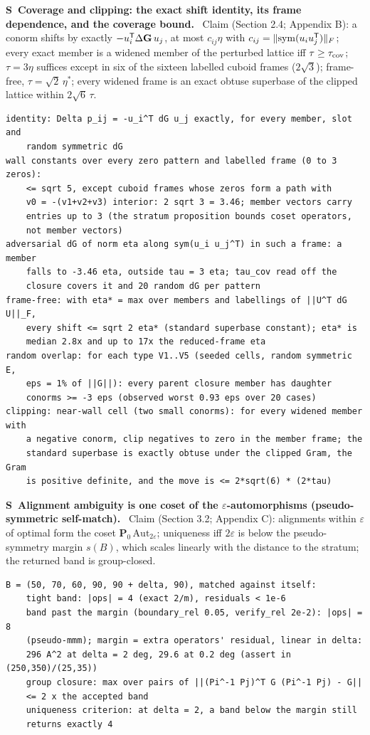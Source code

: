\documentclass[11pt]{article}
\newcommand{\Gmet}{\mathbf{G}}
\newcommand{\Pop}{\mathbf{P}}
\newcounter{scheck}
\renewcommand{\thescheck}{S\arabic{scheck}}
\newcommand{\sitem}[2]{\medskip\noindent\refstepcounter{scheck}\label{#1}\textbf{\thescheck\ #2.}\ }
\begin{document}
\sitem{z:overlap}{Coverage and clipping: the exact shift identity, its frame dependence, and the coverage bound}
Claim (Section 2.4; Appendix B): a conorm shifts by exactly $-u_i^{\sf T}\Delta\Gmet\,u_j$, at most $c_{ij}\eta$ with $c_{ij}=\|\mathrm{sym}(u_iu_j^{\sf T})\|_F$; every exact member is a widened member of the perturbed lattice iff $\tau\ge\tau_{\rm cov}$; $\tau=3\eta$ suffices except in six of the sixteen labelled cuboid frames ($2\sqrt3$); frame-free, $\tau=\sqrt2\,\eta^*$; every widened frame is an exact obtuse superbase of the clipped lattice within $2\sqrt6\,\tau$.
\begin{footnotesize}\begin{verbatim}
identity: Delta p_ij = -u_i^T dG u_j exactly, for every member, slot and
    random symmetric dG
wall constants over every zero pattern and labelled frame (0 to 3 zeros):
    <= sqrt 5, except cuboid frames whose zeros form a path with
    v0 = -(v1+v2+v3) interior: 2 sqrt 3 = 3.46; member vectors carry
    entries up to 3 (the stratum proposition bounds coset operators,
    not member vectors)
adversarial dG of norm eta along sym(u_i u_j^T) in such a frame: a member
    falls to -3.46 eta, outside tau = 3 eta; tau_cov read off the
    closure covers it and 20 random dG per pattern
frame-free: with eta* = max over members and labellings of ||U^T dG U||_F,
    every shift <= sqrt 2 eta* (standard superbase constant); eta* is
    median 2.8x and up to 17x the reduced-frame eta
random overlap: for each type V1..V5 (seeded cells, random symmetric E,
    eps = 1% of ||G||): every parent closure member has daughter
    conorms >= -3 eps (observed worst 0.93 eps over 20 cases)
clipping: near-wall cell (two small conorms): for every widened member with
    a negative conorm, clip negatives to zero in the member frame; the
    standard superbase is exactly obtuse under the clipped Gram, the Gram
    is positive definite, and the move is <= 2*sqrt(6) * (2*tau)
\end{verbatim}\end{footnotesize}

\sitem{z:align-coset}{Alignment ambiguity is one coset of the $\varepsilon$-automorphisms (pseudo-symmetric self-match)}
Claim (Section 3.2; Appendix C): alignments within $\varepsilon$ of optimal form the coset $\Pop_0\,\mathrm{Aut}_{2\varepsilon}$; uniqueness iff $2\varepsilon$ is below the pseudo-symmetry margin $s(B)$, which scales linearly with the distance to the stratum; the returned band is group-closed.
\begin{footnotesize}\begin{verbatim}
B = (50, 70, 60, 90, 90 + delta, 90), matched against itself:
    tight band: |ops| = 4 (exact 2/m), residuals < 1e-6
    band past the margin (boundary_rel 0.05, verify_rel 2e-2): |ops| = 8
    (pseudo-mmm); margin = extra operators' residual, linear in delta:
    296 A^2 at delta = 2 deg, 29.6 at 0.2 deg (assert in (250,350)/(25,35))
    group closure: max over pairs of ||(Pi^-1 Pj)^T G (Pi^-1 Pj) - G||
    <= 2 x the accepted band
    uniqueness criterion: at delta = 2, a band below the margin still
    returns exactly 4
\end{verbatim}\end{footnotesize}
\end{document}
